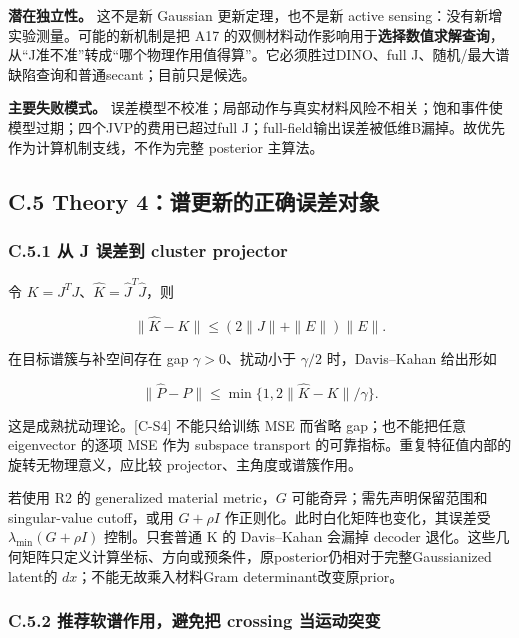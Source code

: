 \documentclass[
  11pt,
  a4paper,
]{article}
\begin{document}
\textbf{潜在独立性。} 这不是新 Gaussian 更新定理，也不是新 active
sensing：没有新增实验测量。可能的新机制是把 A17
的双侧材料动作影响用于\textbf{选择数值求解查询}，从``J准不准''转成``哪个物理作用值得算''。它必须胜过DINO、full
J、随机/最大谱缺陷查询和普通secant；目前只是候选。

\textbf{主要失败模式。}
误差模型不校准；局部动作与真实材料风险不相关；饱和事件使模型过期；四个JVP的费用已超过full
J；full-field输出误差被低维B漏掉。故优先作为计算机制支线，不作为完整
posterior 主算法。

\hypertarget{c.5-theory-4ux8c31ux66f4ux65b0ux7684ux6b63ux786eux8befux5deeux5bf9ux8c61}{%
\subsection{C.5 Theory
4：谱更新的正确误差对象}\label{c.5-theory-4ux8c31ux66f4ux65b0ux7684ux6b63ux786eux8befux5deeux5bf9ux8c61}}

\hypertarget{c.5.1-ux4ece-j-ux8befux5deeux5230-cluster-projector}{%
\subsubsection{C.5.1 从 J 误差到 cluster
projector}\label{c.5.1-ux4ece-j-ux8befux5deeux5230-cluster-projector}}

令 \(K=J^TJ\)、\(\widehat K=\widehat J^T\widehat J\)，则

\[
\|\widehat K-K\|\le(2\|J\|+\|E\|)\|E\|.
\]

在目标谱簇与补空间存在 gap \(\gamma>0\)、扰动小于 \(\gamma/2\)
时，Davis--Kahan 给出形如

\[
\|\widehat P-P\|\le\min\{1,2\|\widehat K-K\|/\gamma\}.
\]

这是成熟扰动理论。{[}C-S4{]} 不能只给训练 MSE 而省略 gap；也不能把任意
eigenvector 的逐项 MSE 作为 subspace transport
的可靠指标。重复特征值内部的旋转无物理意义，应比较
projector、主角度或谱簇作用。

若使用 R2 的 generalized material metric，\(G\)
可能奇异；需先声明保留范围和 singular-value cutoff，或用 \(G+\rho I\)
作正则化。此时白化矩阵也变化，其误差受 \(\lambda_{\min}(G+\rho I)\)
控制。只套普通 K 的 Davis--Kahan 会漏掉 decoder
退化。这些几何矩阵只定义计算坐标、方向或预条件，原posterior仍相对于完整Gaussianized
latent的 \(dx\)；不能无故乘入材料Gram determinant改变原prior。

\hypertarget{c.5.2-ux63a8ux8350ux8f6fux8c31ux4f5cux7528ux907fux514dux628a-crossing-ux5f53ux8fd0ux52a8ux7a81ux53d8}{%
\subsubsection{C.5.2 推荐软谱作用，避免把 crossing
当运动突变}\label{c.5.2-ux63a8ux8350ux8f6fux8c31ux4f5cux7528ux907fux514dux628a-crossing-ux5f53ux8fd0ux52a8ux7a81ux53d8}}
\end{document}
